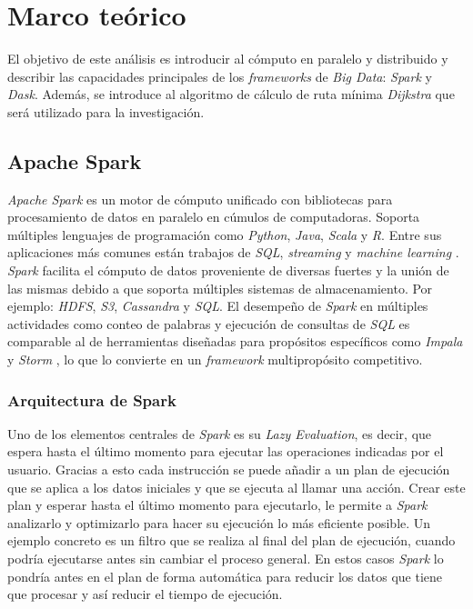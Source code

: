 \chapter{Marco teórico}

\noindent El objetivo de este análisis es introducir al cómputo en paralelo y distribuido y describir las capacidades principales de los \textit{frameworks}  de \textit{Big Data}: \textit{Spark} y \textit{Dask}. Además, se introduce al algoritmo de cálculo de ruta mínima \textit{Dijkstra} que será utilizado para la investigación.

\section{Apache Spark}

\textit{Apache Spark} es un motor de cómputo unificado con bibliotecas para procesamiento de datos en paralelo en cúmulos de computadoras. Soporta múltiples lenguajes de programación como \textit{Python}, \textit{Java}, \textit{Scala} y \textit{R}. Entre sus aplicaciones más comunes están trabajos de \textit{SQL}, \textit{streaming} y \textit{machine learning} \cite{sparkguide}. \textit{Spark} facilita el cómputo de datos proveniente de diversas fuertes y la unión de las mismas debido a que soporta múltiples sistemas de almacenamiento. Por ejemplo: \textit{HDFS}, \textit{S3}, \textit{Cassandra} y \textit{SQL}. El desempeño de \textit{Spark} en múltiples actividades como conteo de palabras y ejecución de consultas de \textit{SQL} es comparable al de herramientas diseñadas para propósitos específicos como \textit{Impala} y \textit{Storm} \cite{sparkberkeley}, lo que lo convierte en un \textit{framework} multipropósito competitivo.

\subsection{Arquitectura de Spark}

Uno de los elementos centrales de \textit{Spark} es su \textit{Lazy Evaluation}, es decir, que espera hasta el último momento para ejecutar las operaciones indicadas por el usuario. Gracias a esto cada instrucción se puede añadir a un plan de ejecución que se aplica a los datos iniciales y que se ejecuta al llamar una acción. Crear este plan y esperar hasta el último momento para ejecutarlo, le permite a \textit{Spark} analizarlo y optimizarlo para hacer su ejecución lo más eficiente posible. Un ejemplo concreto es un filtro que se realiza al final del plan de ejecución, cuando podría ejecutarse antes sin cambiar el proceso general. En estos casos \textit{Spark} lo pondría antes en el plan de forma automática para reducir los datos que tiene que procesar y así reducir el tiempo de ejecución.

